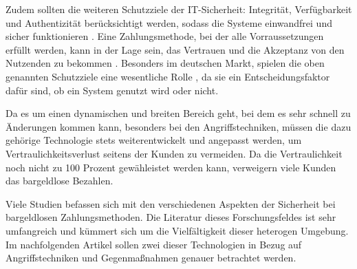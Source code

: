 Zudem sollten die weiteren Schutzziele der IT-Sicherheit: Integrität, Verfügbarkeit und Authentizität
berücksichtigt werden, sodass die Systeme einwandfrei und sicher funktionieren \cite{refip:GMPS}. 
Eine Zahlungsmethode, bei der alle Vorraussetzungen erfüllt werden, kann in der Lage sein, das Vertrauen 
und die Akzeptanz von den Nutzenden zu bekommen \cite{refart:HARE}. Besonders im deutschen Markt, spielen
die oben genannten Schutzziele eine wesentliche Rolle \cite{refip:DKAM}, da sie ein Entscheidungsfaktor 
dafür sind, ob ein System genutzt wird oder nicht.




Da es um einen dynamischen und breiten Bereich geht, bei dem es sehr schnell zu Änderungen kommen kann, 
besonders bei den Angriffstechniken, müssen die dazu gehörige \cite{refip:NYRS} Technologie stets 
weiterentwickelt und angepasst werden, um Vertraulichkeitsverlust seitens der Kunden zu vermeiden. 
Da die Vertraulichkeit noch nicht zu 100 Prozent gewähleistet werden kann, verweigern viele Kunden
das bargeldlose Bezahlen.

Viele Studien befassen sich mit den verschiedenen Aspekten der Sicherheit bei bargeldlosen Zahlungsmethoden.
Die Literatur dieses Forschungsfeldes ist sehr umfangreich und kümmert sich um die Vielfältigkeit 
dieser heterogen \cite{refip:GMPS} Umgebung. Im nachfolgenden Artikel sollen zwei dieser Technologien 
in Bezug auf Angriffstechniken und Gegenmaßnahmen genauer betrachtet werden.

